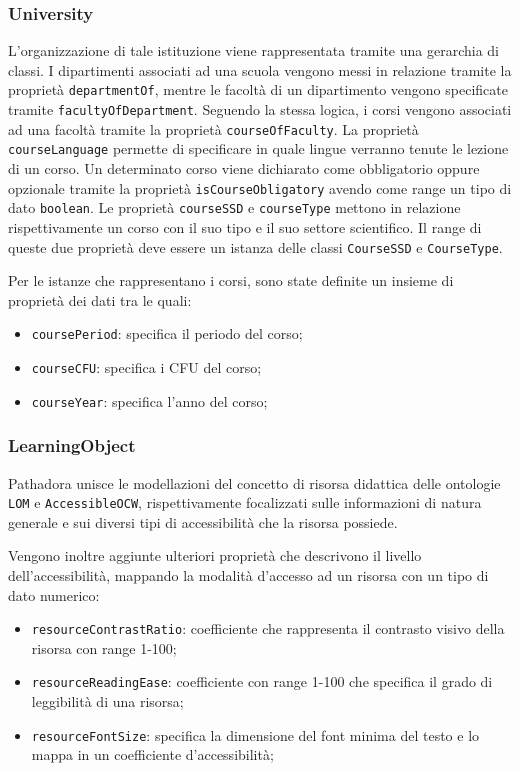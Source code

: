 \subsubsection{University}
L'organizzazione di tale istituzione viene rappresentata tramite una gerarchia di classi. I dipartimenti associati ad una scuola vengono messi in relazione tramite la proprietà \texttt{departmentOf}, mentre le facoltà di un dipartimento vengono specificate tramite \texttt{facultyOfDepartment}. Seguendo la stessa logica, i corsi vengono associati ad una facoltà tramite la proprietà \texttt{courseOfFaculty}. La proprietà \texttt{courseLanguage} permette di specificare in quale lingue verranno tenute le lezione di un corso. Un determinato corso viene dichiarato come obbligatorio oppure opzionale tramite la proprietà \texttt{isCourseObligatory} avendo come range un tipo di dato \texttt{boolean}. Le proprietà \texttt{courseSSD} e \texttt{courseType} mettono in relazione rispettivamente un corso con il suo tipo e il suo settore scientifico. Il range di queste due proprietà deve essere un istanza delle classi \texttt{CourseSSD} e \texttt{CourseType}. 

Per le istanze che rappresentano i corsi, sono state definite un insieme di proprietà dei dati tra le quali:
\begin{itemize}
    \item \texttt{coursePeriod}: specifica il periodo del corso;
    \item \texttt{courseCFU}: specifica i CFU del corso;
    \item \texttt{courseYear}: specifica l'anno del corso;
\end{itemize}

\subsubsection{LearningObject}
Pathadora unisce le modellazioni del concetto di risorsa didattica delle ontologie \texttt{LOM} e \texttt{AccessibleOCW}, rispettivamente focalizzati sulle informazioni di natura generale e sui diversi tipi di accessibilità che la risorsa possiede.

Vengono inoltre aggiunte ulteriori proprietà che descrivono il livello dell'accessibilità, mappando la modalità d'accesso ad un risorsa con un tipo di dato numerico:
\begin{itemize}
    \item \texttt{resourceContrastRatio}: coefficiente che rappresenta il contrasto visivo della risorsa con range 1-100;
    \item \texttt{resourceReadingEase}: coefficiente con range 1-100 che specifica il grado di leggibilità di una risorsa;
    \item \texttt{resourceFontSize}: specifica la dimensione del font minima del testo e lo mappa in un coefficiente d'accessibilità;
\end{itemize}


